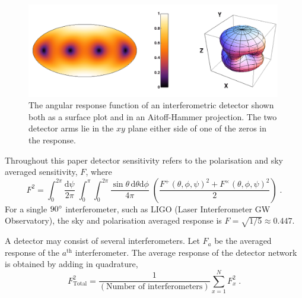 \begin{figure}[h!]
 \centering
 \includegraphics[trim=0cm 0cm 0cm 0cm, width=0.99\textwidth]{LIGO_detectorframe.pdf}
 \caption{The angular response function of an interferometric detector shown both as a surface plot and in an Aitoff-Hammer projection. The two detector arms lie in the $xy$ plane either side of one of the zeros in the response.}
 \label{fig:LIGO}
\end{figure}

Throughout this paper detector sensitivity refers to the polarisation and sky averaged sensitivity, $F$, where
\begin{equation}\label{eq:skyav} F^{2}=\int_{0}^{2\pi}\frac{\textrm{d}\psi}{2\pi}\; \int_{0}^{\pi}\int_{0}^{2\pi}\frac{\sin\theta\,\textrm{d}\theta\textrm{d}\phi}{4\pi}\;\left(\frac{F^{+}\left(\theta,\phi,\psi\right)^{2}+F^{\times}\left(\theta,\phi,\psi\right)^{2}}{2}\right)\; .\end{equation}
For a single $90^\circ$ interferometer, such as LIGO (Laser Interferometer GW Observatory), the sky and polarisation averaged response is $F=\sqrt{1/5}\approx 0.447$.

A detector may consist of several interferometers. Let $F_{a}$ be the averaged response of the $a^{\textrm{th}}$ interferometer. The average response of the detector network is obtained by adding in quadrature,
\begin{equation} F_{\textrm{Total}}^{2}=\frac{1}{\left(\textrm{Number of interferometers}\right)}\sum_{x=1}^{N}F_{x}^{2} \; .\end{equation}

